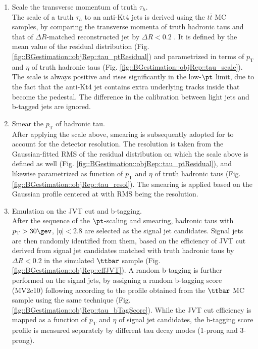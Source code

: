 \begin{enumerate}
\item Scale the transverse momentum of truth $\tau_h$. \\
The scale of a truth $\tau_h$ to an anti-Kt4 jets is derived using the $t\bar{t}$ MC samples, 
by comparing the transverse momenta of truth hadronic taus and that of $\Delta R$-matched reconstructed jet by $\Delta R<0.2$
. It is defined by the mean value of the residual distribution (Fig. \ref{fig::BGestimation::objRep::tau_ptResidual}) and parametrized in terms of $p_{\mathrm{T}}$ and $\eta$ of truth hadronic taus (Fig. \ref{fig::BGestimation::objRep::tau_scale}). The scale is always positive and rises significantly in the low-$\pt$ limit, due to the fact that the anti-Kt4 jet contains extra underlying tracks inside that become the pedestal. The difference in the calibration between light jets and b-tagged jets are ignored. \\


\item Smear the $p_{\mathrm{T}}$ of hadronic tau. \\
After applying the scale above, smearing is subsequently adopted for to account for the detector resolution.
The resolution is taken from the Gaussian-fitted RMS of the residual distribution on which the scale above is defined as well (Fig. \ref{fig::BGestimation::objRep::tau_ptResidual}), and likewise parametrized as function of $p_{\mathrm{T}}$ and $\eta$ of truth hadronic taus (Fig. \ref{fig::BGestimation::objRep::tau_resol}). The smearing is applied based on the Gaussian profile centered at with RMS being the resolution. \\


\item Emulation on the JVT cut and b-tagging.  \\
After the sequence of the $\pt$-scaling and smearing, hadronic taus with $p_{\mathrm{T}}>30\gev$, $|\eta|<2.8$ are selected as the signal jet candidates.
Signal jets are then randomly identified from them, based on the efficiency of JVT cut derived from signal jet candidates matched with truth hadronic taus by $\Delta R<0.2$ in the simulated $\ttbar$ sample (Fig. \ref{fig::BGestimation::objRep::effJVT}). 
A random b-tagging is further performed on the signal jets, by assigning a random b-tagging score (MV2c10) following according to the profile obtained from the $\ttbar$ MC sample using the same technique (Fig. \ref{fig::BGestimation::objRep::tau_bTagScore}). While the JVT cut efficiency is mapped as a function of $p_{\mathrm{T}}$ and $\eta$ of signal jet candidates, the b-tagging score profile is measured separately by different tau decay modes (1-prong and 3-prong).
\end{enumerate}

